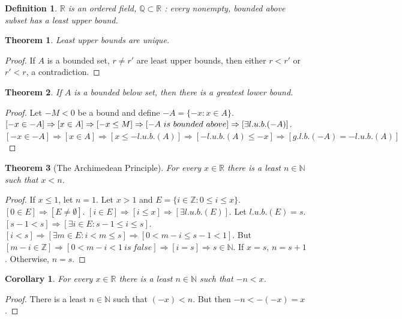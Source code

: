 \documentclass[oneside]{book}
\theoremstyle{mystyle}
\newtheorem{theorem}{Theorem}[section]
\newtheorem{definition}{Definition}[section]
\newtheorem{corollary}{Corollary}[section]
\begin{document}
\begin{definition}
$\mathbb{R}$ is an ordered field, $\mathbb{Q}\subset \mathbb{R}$ : every nonempty, bounded above subset has a least upper bound.
\end{definition}

\begin{theorem}
Least upper bounds are unique.
\end{theorem}
\begin{proof}
If $A$ is a bounded set, $r\ne r'$ are least upper bounds, then either $r<r'$ or $r'<r$, a contradiction.
\end{proof}

\begin{theorem}
If $A$ is a bounded below set, then there is a greatest lower bound.
\end{theorem}
\begin{proof}
Let $-M<0$ be a bound and define $-A = \{-x: x\in A\}$. $[-x\in -A]\Rightarrow [x\in A]\Rightarrow [-x\leq M]\Rightarrow [-A\ is\ bounded\ above]\\ \Rightarrow [\exists l.u.b.(-A)]$. $[-x\in -A]\Rightarrow [x\in A]\Rightarrow [x\leq -l.u.b.(A)]\Rightarrow [-l.u.b.(A)\leq -x]\Rightarrow [g.l.b.(-A)=-l.u.b.(A)]$
\end{proof}

\begin{theorem}[The Archimedean Principle]
For every $x\in \mathbb{R}$ there is a least $n\in \mathbb{N}$ such that $x<n$. 
\end{theorem}
\begin{proof}
If $x\leq1$, let $n=1$. Let $x>1$ and $E=\{i \in \mathbb{Z}: 0 \leq i \leq x\}$. $[0\in E]\Rightarrow [E\ne \emptyset]$. $[i\in E]\Rightarrow [i\leq x]\Rightarrow [\exists l.u.b.(E)]$. Let $l.u.b.(E)=s$. $[s-1<s]\Rightarrow [\exists i \in E:s-1 \leq i \leq s]$. $[i< s]\Rightarrow[\exists m\in E: i < m \leq s]\Rightarrow [0 < m-i \leq s-1 < 1]$. But $[m-i \in \mathbb{Z}]\Rightarrow [0<m-i<1\ is\ false]\Rightarrow [i = s]\Rightarrow s\in \mathbb{N}$. If $x=s$, $n = s+1$. Otherwise, $n=s$.
\end{proof}

\begin{corollary}
For every $x\in \mathbb{R}$ there is a least $n\in \mathbb{N}$ such that $-n<x$.
\end{corollary}
\begin{proof}
There is a least $n\in \mathbb{N}$ such that $(-x)<n$. But then $-n <-(-x) = x$. 
\end{proof}
\end{document}
